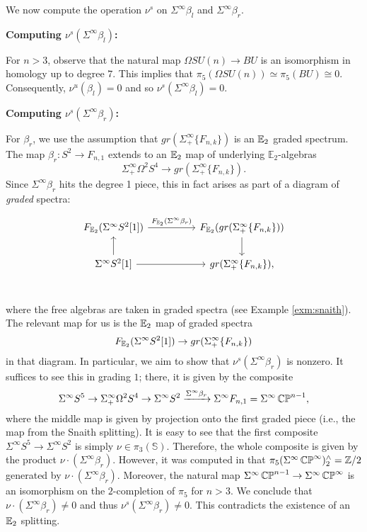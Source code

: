 We now compute the operation $\nu^s$ on $\Sigma^{\infty} \beta_l$ and $\Sigma^{\infty} \beta_r$.  

\textbf{Computing $\nu^s(\Sigma^{\infty}\beta_l)$:}

For $n>3$, observe that the natural map $\Omega SU(n) \to BU$ is an isomorphism in homology up to degree $7$.  This implies that $\pi_5(\Omega SU(n)) \simeq \pi_5(BU) \cong 0$.  Consequently, $\nu^u(\beta_l) = 0$ and so $\nu^s(\Sigma^{\infty} \beta_l) = 0.$  

\textbf{Computing $\nu^s(\Sigma^{\infty}\beta_r)$:}

For $\beta_r$, we use the assumption that $gr(\Sigma^{\infty}_+ \{ F_{n,k} \})$ is an $\operatorname{\mathbb{E}}_2$ graded spectrum.  The map $\beta_r: S^2 \to F_{n,1}$ extends to an $\operatorname{\mathbb{E}}_2$ map of underlying $\mathbb{E}_2$-algebras $$\Sigma^{\infty}_+ \Omega^2 S^4 \to  gr(\Sigma^{\infty}_+ \{ F_{n,k} \}).$$  Since $\Sigma^{\infty} \beta_r$ hits the degree 1 piece, this in fact arises as part of a diagram of \emph{graded} spectra:

$$
\begin{tikzcd}
 F_{\E_2}(\Sigma^{\infty}S^2[1])\arrow[rr,"F_{\E_2}(\Sigma^{\infty} \beta_r)"]& & F_{\E_2}(gr(\Sigma^{\infty}_+ \{ F_{n,k}\} ))\arrow[d]\\
 \Sigma^{\infty}S^2[1] \arrow[rr] \arrow[u]&& gr(\Sigma^{\infty}_+ \{ F_{n,k} \} ), \\ 
\end{tikzcd}
$$

where the free algebras are taken in graded spectra (see Example \ref{exm:snaith}).  The relevant map for us is the $\operatorname{\mathbb{E}}_2$ map of graded spectra $$F_{\operatorname{\mathbb{E}}_2}(\Sigma^\infty S^2[1]) \to gr(\Sigma^{\infty}_+ \{ F_{n,k} \})$$ in that diagram.  In particular, we aim to show that $\nu^s(\Sigma^\infty \beta_r)$ is nonzero. It suffices to see this in grading $1$; there, it is given by the composite $$\Sigma^{\infty} S^5 \to \Sigma^{\infty}_+ \Omega^2 S^4 \to \Sigma^{\infty} S^2 \xrightarrow{\Sigma^{\infty} \beta_r} \Sigma^{\infty} F_{n,1} =\Sigma^{\infty} \operatorname{\mathbb{CP}}^{n-1},$$ where the middle map is given by projection onto the first graded piece (i.e., the map from the Snaith splitting).  It is easy to see that the first composite $\Sigma^{\infty} S^5 \to \Sigma^{\infty} S^2$ is simply $\nu \in \pi_3(\mathbb{S}).$  Therefore, the whole composite is given by the product $\nu\cdot (\Sigma^{\infty} \beta_r).$  
However, it was computed in \cite[Theorem II.8]{Liulevicius} that $\pi_5(\Sigma^{\infty}\operatorname{\mathbb{CP}}^{\infty})^{\wedge}_2=\mathbb{Z}/2$ generated by $\nu \cdot (\Sigma^{\infty}\beta_r).$  Moreover, the natural map $\Sigma^{\infty}\operatorname{\mathbb{CP}}^{n-1} \to \Sigma^{\infty}\operatorname{\mathbb{CP}}^\infty$ is an isomorphism on the $2$-completion of $\pi_5$ for $n>3$.  We conclude that $\nu \cdot (\Sigma^{\infty}\beta_r )\neq 0$ and thus $\nu^s(\Sigma^{\infty} \beta_r) \neq 0$.  This contradicts the existence of an $\operatorname{\mathbb{E}}_2$ splitting.   



